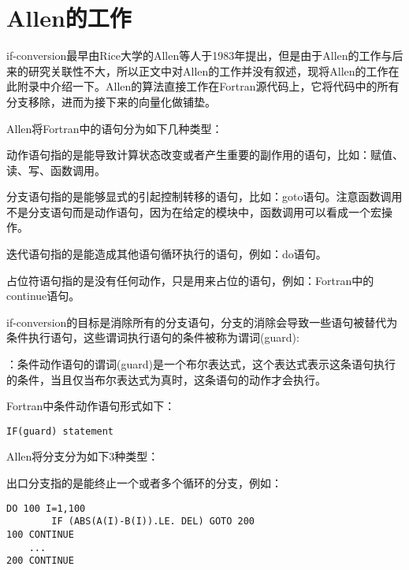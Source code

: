 \section{Allen的工作}

if-conversion最早由Rice大学的Allen等人于1983年提出\cite{allen1983Concondeptodatdep}，但是由于Allen的工作与后来的研究关联性不大，所以正文中对Allen的工作并没有叙述，现将Allen的工作在此附录中介绍一下。Allen的算法直接工作在Fortran源代码上，它将代码中的所有分支移除，进而为接下来的向量化做铺垫。

Allen将Fortran中的语句分为如下几种类型：
\begin{definition}
动作语句指的是能导致计算状态改变或者产生重要的副作用的语句，比如：赋值、读、写、函数调用。
\end{definition}

\begin{definition}
分支语句指的是能够显式的引起控制转移的语句，比如：goto语句。注意函数调用不是分支语句而是动作语句，因为在给定的模块中，函数调用可以看成一个宏操作。
\end{definition}

\begin{definition}
迭代语句指的是能造成其他语句循环执行的语句，例如：do语句。
\end{definition}

\begin{definition}
占位符语句指的是没有任何动作，只是用来占位的语句，例如：Fortran中的continue语句。
\end{definition}

if-conversion的目标是消除所有的分支语句，分支的消除会导致一些语句被替代为条件执行语句，这些谓词执行语句的条件被称为谓词(guard):

\begin{definition}[谓词(guard)]：条件动作语句的谓词(guard)是一个布尔表达式，这个表达式表示这条语句执行的条件，当且仅当布尔表达式为真时，这条语句的动作才会执行。
\end{definition}

Fortran中条件动作语句形式如下：
\begin{lstlisting}[language=FORTRAN]
IF(guard) statement
\end{lstlisting}

Allen将分支分为如下3种类型：
\begin{definition}
出口分支指的是能终止一个或者多个循环的分支，例如：
\begin{lstlisting}[language=FORTRAN]
	DO 100 I=1,100
		IF (ABS(A(I)-B(I)).LE. DEL) GOTO 200
100	CONTINUE
	...
200 CONTINUE
\end{lstlisting}
\end{definition}

